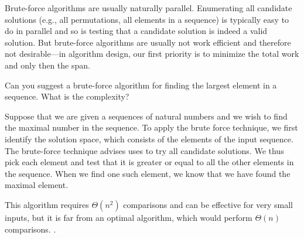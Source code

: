 \begin{cluster}
\label{grp:imp:design::basics::brute-force}

\begin{important}
\label{imp:design::basics::brute-force}
Brute-force algorithms are usually naturally parallel.
Enumerating all candidate solutions (e.g., all permutations, all
elements in a sequence) is typically easy to do in parallel and so is
testing that a candidate solution is indeed a valid solution.
But
brute-force algorithms are usually not work efficient and therefore not desirable---in algorithm design, our first priority
is to minimize the total work and only then the span.

\end{important}
\end{cluster}

\begin{cluster}
\label{grp:grm:design::basics::suggest}

\begin{gram}
\label{grm:design::basics::suggest}
\begin{teachask}
  Can you suggest a brute-force algorithm for finding the largest
  element in a sequence.  What is the complexity?
\end{teachask}
\begin{example}
Suppose that we are given a sequences of natural numbers and we wish
to find the maximal number in the sequence.
To apply the brute force technique, we first identify the solution
space, which consists of the elements of the input sequence.
The brute-force technique advises uses to try all candidate solutions.
We thus pick each element and test that it is greater or equal to all
the other elements in the sequence.  When we find one such element, we
know that we have found the maximal element.

This algorithm requires $\Theta(n^2)$ comparisons and can be effective
for very small inputs, but it is far from an optimal algorithm, which
would perform $\Theta(n)$ comparisons.  .
\end{example}

\end{gram}
\end{cluster}

